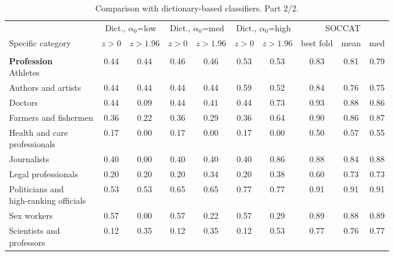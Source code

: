 \begin{table}[htb]
\centering
\renewcommand{\arraystretch}{0.9}
\scriptsize
\begin{threeparttable}
\caption{Comparison with dictionary-based classifiers. Part 2/2.}
\label{tab:dictionary_alpha0_sweep_part2}
\begin{tabular}{l c c c c c c c c c}
\toprule
 & \multicolumn{2}{c}{Dict., $\alpha_0$=low} & \multicolumn{2}{c}{Dict., $\alpha_0$=med} & \multicolumn{2}{c}{Dict., $\alpha_0$=high} & \multicolumn{3}{c}{SOCCAT} \\
\cmidrule(lr){2-3} \cmidrule(lr){4-5} \cmidrule(lr){6-7} \cmidrule(lr){8-10}
Specific category & \multicolumn{1}{c}{$z>0$} & \multicolumn{1}{c}{$z>1.96$} & \multicolumn{1}{c}{$z>0$} & \multicolumn{1}{c}{$z>1.96$} & \multicolumn{1}{c}{$z>0$} & \multicolumn{1}{c}{$z>1.96$} & \multicolumn{1}{c}{best fold} & \multicolumn{1}{c}{mean} & \multicolumn{1}{c}{med} \\
\midrule
\rule{0pt}{5pt} &  &  &  &  &  &  &  &  &  \\
\shortstack[l]{\textbf{Profession}\\[3pt]Athletes} & 0.44 & 0.44 & 0.46 & 0.46 & 0.53 & 0.53 & 0.83 & 0.81 & 0.79 \\
Authors and artists & 0.44 & 0.44 & 0.44 & 0.44 & 0.59 & 0.52 & 0.84 & 0.76 & 0.75 \\
Doctors & 0.44 & 0.09 & 0.44 & 0.41 & 0.44 & 0.73 & 0.93 & 0.88 & 0.86 \\
Farmers and fishermen & 0.36 & 0.22 & 0.36 & 0.29 & 0.36 & 0.64 & 0.90 & 0.86 & 0.87 \\
\shortstack[l]{Health and care\\[-3pt]professionals} & 0.17 & 0.00 & 0.17 & 0.00 & 0.17 & 0.00 & 0.50 & 0.57 & 0.55 \\
Journalists & 0.40 & 0.00 & 0.40 & 0.40 & 0.40 & 0.86 & 0.88 & 0.84 & 0.88 \\
Legal professionals & 0.20 & 0.20 & 0.20 & 0.34 & 0.20 & 0.38 & 0.60 & 0.73 & 0.73 \\
\shortstack[l]{Politicians and\\[-3pt]high-ranking officials} & 0.53 & 0.53 & 0.65 & 0.65 & 0.77 & 0.77 & 0.91 & 0.91 & 0.91 \\
Sex workers & 0.57 & 0.00 & 0.57 & 0.22 & 0.57 & 0.29 & 0.89 & 0.88 & 0.89 \\
\shortstack[l]{Scientists and\\[-3pt]professors} & 0.12 & 0.35 & 0.12 & 0.35 & 0.12 & 0.53 & 0.77 & 0.76 & 0.77 \\

\end{tabular}
\end{threeparttable}
\end{table}
